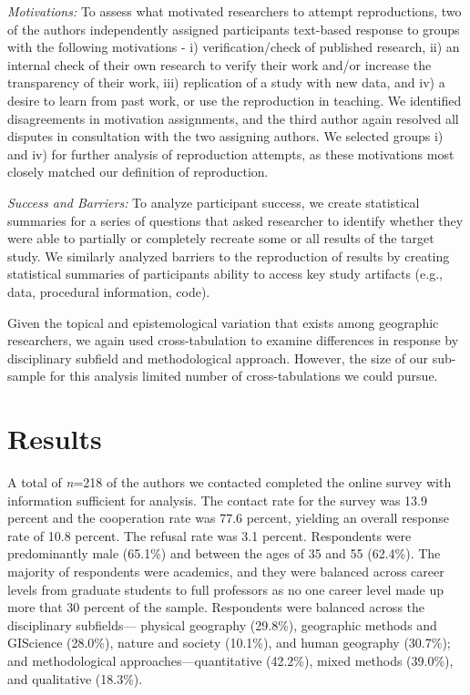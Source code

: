 \documentclass[]{interact}
\theoremstyle{plain}%
\theoremstyle{definition}
\theoremstyle{remark}
\begin{document}
\textit{Motivations:} To assess what motivated researchers to attempt reproductions, two of the authors independently assigned participants text-based response to groups with the following motivations - i) verification/check of published research, ii) an internal check of their own research to verify their work and/or increase the transparency of their work, iii) replication of a study with new data, and iv) a desire to learn from past work, or use the reproduction in teaching. 
We identified disagreements in motivation assignments, and the third author again resolved all disputes in consultation with the two assigning authors.
We selected groups i) and iv) for further analysis of reproduction attempts, as these motivations most closely matched our definition of reproduction. 

\textit{Success and Barriers:} To analyze participant success, we create statistical summaries for a series of questions that asked researcher to identify whether they were able to partially or completely recreate some or all results of the target study. 
We similarly analyzed barriers to the reproduction of results by creating statistical summaries of participants ability to access key study artifacts (e.g., data, procedural information, code).  

Given the topical and epistemological variation that exists among geographic researchers, we again used cross-tabulation to examine differences in response by disciplinary subfield and methodological approach.
However, the size of our sub-sample for this analysis limited number of cross-tabulations we could pursue.

\section*{Results}
A total of \textit{n}=218 of the authors we contacted completed the online survey with information sufficient for analysis. 
The contact rate for the survey was 13.9 percent and the cooperation rate was 77.6 percent, yielding an overall response rate of 10.8 percent. 
The refusal rate was 3.1 percent.
Respondents were predominantly male (65.1\%) and between the ages of 35 and 55 (62.4\%). 
The majority of respondents were academics, and they were balanced across career levels from graduate students to full professors as no one career level made up more that 30 percent of the sample.
Respondents were balanced across the disciplinary subfields--- physical geography (29.8\%), geographic methods and GIScience (28.0\%), nature and society (10.1\%), and human geography (30.7\%); and methodological approaches---quantitative (42.2\%), mixed methods (39.0\%), and qualitative (18.3\%).
\end{document}
